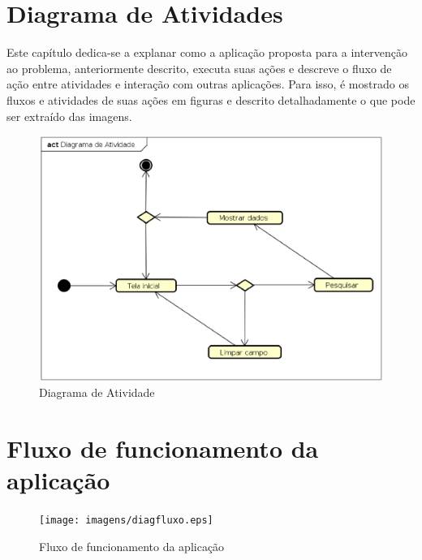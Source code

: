 
\section{Diagrama de Atividades}
Este capítulo dedica-se a explanar como a aplicação proposta para a intervenção ao problema, anteriormente descrito, executa suas ações e descreve o fluxo de ação entre atividades e interação com outras aplicações. Para isso, é mostrado os fluxos e atividades de suas ações em figuras e descrito detalhadamente o que pode ser extraído das imagens.



\begin{figure}[!htb]
        \caption{\label{diagact}Diagrama de Atividade}
        \begin{center}
                \includegraphics[width=\textwidth]{imagens/diagact.eps}
        \end{center}
\end{figure}

\newpage
\section{Fluxo de funcionamento da aplicação}
\lipsum[3-7]

\begin{figure}[!htb]
        \caption{\label{diagfluxo}Fluxo de funcionamento da aplicação}
        \begin{center}
                \texttt{[image: imagens/diagfluxo.eps]}
        \end{center}
\end{figure}
